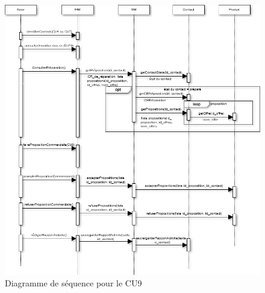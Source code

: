\begin{figure}[H]
	\begin{center}
		\includegraphics[scale=0.4]{Includes/SOA-Sequence-CU9.png}
		\caption{Diagramme de séquence pour le CU9}
	\end{center}
\end{figure}


